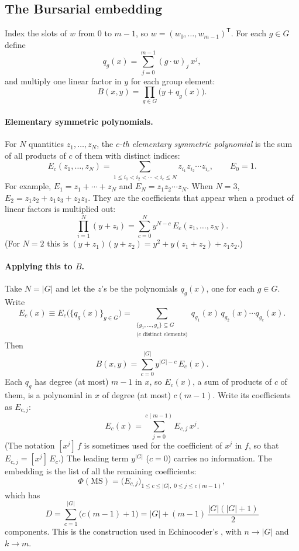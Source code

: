 \documentclass[11pt]{article}
\theoremstyle{definition}
\theoremstyle{remark}
\newcommand{\MS}{\mathrm{MS}}
\begin{document}
\subsection{The Bursarial embedding}

Index the slots of $w$ from $0$ to $m-1$, so $w = (w_0, \ldots, w_{m-1})^{\mathsf T}$.
For each $g \in G$ define
\[
  q_g(x) = \sum_{j=0}^{m-1} (g \cdot w)_j \, x^j ,
\]
and multiply one linear factor in $y$ for each group element:
\[
  B(x, y) = \prod_{g \in G} \bigl( y + q_g(x) \bigr).
\]

\paragraph{Elementary symmetric polynomials.}
For $N$ quantities $z_1, \ldots, z_N$, the \emph{$c$-th elementary symmetric
polynomial} is the sum of all products of $c$ of them with distinct indices:
\[
  E_c(z_1, \ldots, z_N) = \sum_{1 \le i_1 < i_2 < \cdots < i_c \le N}
                          z_{i_1} z_{i_2} \cdots z_{i_c},
  \qquad E_0 = 1.
\]
For example, $E_1 = z_1 + \cdots + z_N$ and $E_N = z_1 z_2 \cdots z_N$. When
$N = 3$, $E_2 = z_1 z_2 + z_1 z_3 + z_2 z_3$. They are the coefficients that
appear when a product of linear factors is multiplied out:
\[
  \prod_{i=1}^{N} (y + z_i) = \sum_{c=0}^{N} y^{N-c}\, E_c(z_1, \ldots, z_N).
\]
(For $N = 2$ this is $(y + z_1)(y + z_2) = y^2 + y(z_1 + z_2) + z_1 z_2$.)

\paragraph{Applying this to $B$.}
Take $N = |G|$ and let the $z$'s be the polynomials $q_g(x)$, one for each
$g \in G$. Write
\[
  E_c(x) \equiv E_c\bigl(\{q_g(x)\}_{g \in G}\bigr)
        = \sum_{\substack{\{g_1, \ldots, g_c\} \subseteq G\\ \text{($c$ distinct elements)}}}
          q_{g_1}(x)\, q_{g_2}(x) \cdots q_{g_c}(x).
\]
Then
\[
  B(x, y) = \sum_{c=0}^{|G|} y^{|G|-c}\, E_c(x).
\]
Each $q_g$ has degree (at most) $m-1$ in $x$, so $E_c(x)$, a sum of products of
$c$ of them, is a polynomial in $x$ of degree (at most) $c(m-1)$. Write its
coefficients as $E_{c,j}$:
\[
  E_c(x) = \sum_{j=0}^{c(m-1)} E_{c,j}\, x^j .
\]
(The notation $[x^j]\,f$ is sometimes used for the coefficient of $x^j$ in
$f$, so that $E_{c,j} = [x^j]\,E_c$.) The leading term $y^{|G|}$ ($c = 0$)
carries no information. The embedding is the list of all the remaining
coefficients:
\[
  \Phi(\MS) = \bigl( E_{c,j} \bigr)_{1 \le c \le |G|,\; 0 \le j \le c(m-1)},
\]
which has
\[
  D = \sum_{c=1}^{|G|} \bigl( c(m-1) + 1 \bigr) = |G| + (m-1)\,\frac{|G|(|G|+1)}{2}
\]
components. This is the construction used in Echinocoder's
,
with $n \to |G|$ and $k \to m$.
\end{document}
